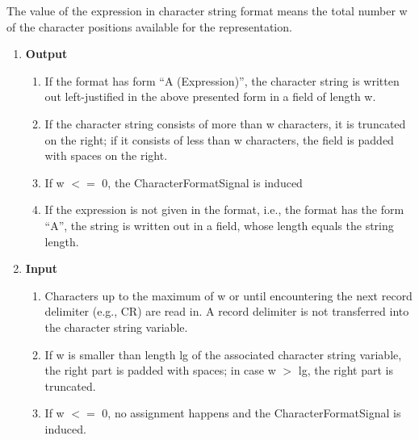 The value of the expression in character string format means the total
number w of the character positions available for the representation.
\begin{enumerate}
\item {\bf Output}\\
\begin{enumerate}
\item If the format has form ``A (Expression)'', the character string is
written out left-justified in the above presented form in a field of
length w.
\item  If the character string consists of more than w characters, it
is truncated on the right; if it consists of less than w characters, the
field is padded with spaces on the right. 
\item If w $<=$ 0, the CharacterFormatSignal is induced
\item If the expression is not given in the format, i.e., the format has the
form ``A'', the string is written out in a field, whose length equals
the string length.
\end{enumerate}
\item {\bf Input}\\
\begin{enumerate}
\item Characters up to the maximum of w or until encountering the next record
delimiter (e.g., CR) are read in. A record delimiter is not transferred
into the character string variable.
\item If w is smaller than length lg of the associated character string
variable, the right part is padded with spaces; in case w $>$ lg, the
right part is truncated.
\item  If w $<=$ 0, no assignment happens and the CharacterFormatSignal is 
   induced. 
\end{enumerate}
\end{enumerate}

